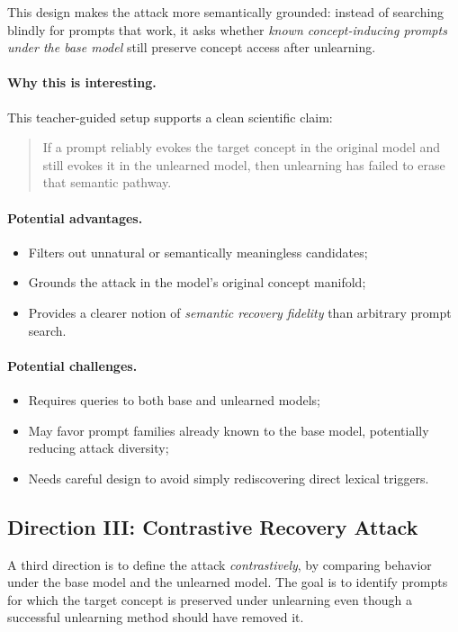 This design makes the attack more semantically grounded: instead of searching blindly for prompts that work, it asks whether \emph{known concept-inducing prompts under the base model} still preserve concept access after unlearning.

\paragraph{Why this is interesting.}
This teacher-guided setup supports a clean scientific claim:
\begin{quote}
If a prompt reliably evokes the target concept in the original model and still evokes it in the unlearned model, then unlearning has failed to erase that semantic pathway.
\end{quote}

\paragraph{Potential advantages.}
\begin{itemize}
    \item Filters out unnatural or semantically meaningless candidates;
    \item Grounds the attack in the model's original concept manifold;
    \item Provides a clearer notion of \emph{semantic recovery fidelity} than arbitrary prompt search.
\end{itemize}

\paragraph{Potential challenges.}
\begin{itemize}
    \item Requires queries to both base and unlearned models;
    \item May favor prompt families already known to the base model, potentially reducing attack diversity;
    \item Needs careful design to avoid simply rediscovering direct lexical triggers.
\end{itemize}

\subsection{Direction III: Contrastive Recovery Attack}
\label{subsec:contrastive_attack}

A third direction is to define the attack \emph{contrastively}, by comparing behavior under the base model and the unlearned model. The goal is to identify prompts for which the target concept is preserved under unlearning even though a successful unlearning method should have removed it.

